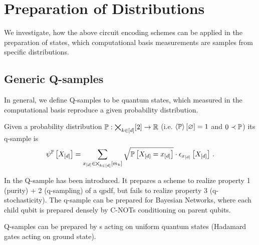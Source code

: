 \section{Preparation of Distributions}

We investigate, how the above circuit encoding schemes can be applied in the preparation of states, which computational basis measurements are samples from specific distributions.

\subsection{Generic Q-samples}

In general, we define Q-samples to be quantum states, which measured in the computational basis reproduce a given probability distribution.

\begin{definition}[Q-sample]
    Given a probability distribution $\mathbb{P}:\bigtimes_{k\in[d]}[2]\rightarrow\mathbb{R}$ (i.e. $\left\langle \mathbb{P}\right\rangle \left[ \varnothing \right]=1$ and $0 \prec \mathbb{P}$) its q-sample is
    \begin{align*}
        \psi^{\mathbb{P}}\left[X_{[d]}\right]
        = \sum_{x_{[d]}\in\bigtimes_{k\in[d]}[m_{k}]} \sqrt{\mathbb{P}\left[X_{[d]}=x_{[d]}\right]} \cdot \epsilon_{x_{[d]}}\left[X_{[d]}\right] \, .
    \end{align*}
\end{definition}

In \cite{low_quantum_2014} the Q-sample has been introduced.
It prepares a scheme to realize property 1 (purity) + 2 (q-sampling) of a qpdf, but fails to realize property 3 (q-stochasticity).
The q-sample can be prepared for Bayesian Networks, where each child qubit is prepared densely by C-NOTs conditioning on parent qubits.

Q-samples can be prepared by \activationCircuit{}s acting on uniform quantum states (Hadamard gates acting on ground state).


